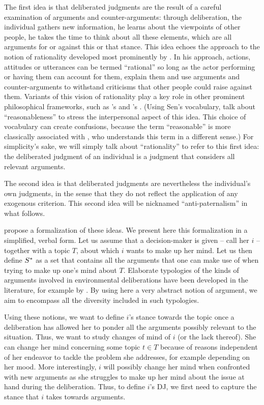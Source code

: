 \documentclass[version=3.21, pagesize, twoside=off, bibliography=totoc, DIV=calc, fontsize=12pt, a4paper, french, english]{scrartcl}
\begin{document}
The first idea is that deliberated judgments are the result of a careful examination of arguments and counter-arguments: through deliberation, the individual gathers new information, he learns about the viewpoints of other people, he takes the time to think about all these elements, 
which are all arguments for or against this or that stance. 
This idea echoes the approach to the notion of rationality developed most prominently by \citet{habermas_theorie_1981}. 
In his approach, actions, attitudes or utterances can be termed “rational” so long as the actor performing or having them can account for them, explain them and use arguments and counter-arguments to withstand criticisms that other people could raise against them. 
Variants of this vision of rationality play a key role in other prominent philosophical frameworks, such as \citeauthor{scanlon_what_2000}’s \citeyearpar{scanlon_what_2000} and \citeauthor{sen_idea_2009}’s \citeyearpar{sen_idea_2009}. 
(Using Sen's vocabulary, \citeauthor{bartkowski_beyond_2018} talk about ``reasonableness'' to stress the interpersonal aspect of this idea. 
This choice of vocabulary can create confusions, because the term ``reasonable'' is more classically associated with \citet{rawls_political_2005}, who understands this term in a different sense.) 
For simplicity's sake, we will simply talk about ``rationality'' to refer to this first idea: the deliberated judgment of an individual is a judgment that considers all relevant arguments.

The second idea is that deliberated judgments are nevertheless the individual's own judgments, in the sense that they do not reflect the application of any exogenous criterion. 
This second idea will be nicknamed ``anti-paternalism'' in what follows. 

\citet{cailloux_formal_2018} propose a formalization of these ideas. We present here this formalization in a simplified, verbal form. 
Let us assume that a decision-maker is given -- call her $i$ -- together with a topic $T$, about which $i$ wants to make up her mind. 
Let us then define $S^*$ as a set that contains all the arguments that one can make use of when trying to make up one’s mind about $T$.
Elaborate typologies of the kinds of arguments involved in environmental deliberations have been developed in the literature, for example by \citet{chateauraynaud_contrainte_2007}. 
By using here a very abstract notion of argument, we aim to encompass all the diversity included in such typologies. 

Using these notions, we want to define $i$’s stance towards the topic once a deliberation has allowed her to ponder all the arguments possibly relevant to the situation. 
Thus, we want to study changes of mind of $i$ (or the lack thereof).
She can change her mind concerning some topic $t \in T$ because of reasons independent of her endeavor to tackle the problem she addresses, for example depending on her mood. 
More interestingly, $i$ will possibly change her mind when confronted with new arguments as she struggles to make up her mind about the issue at hand during the deliberation.
Thus, to define $i$’s \ac{DJ}, we first need to capture the stance that $i$ takes towards arguments. 
\end{document}

